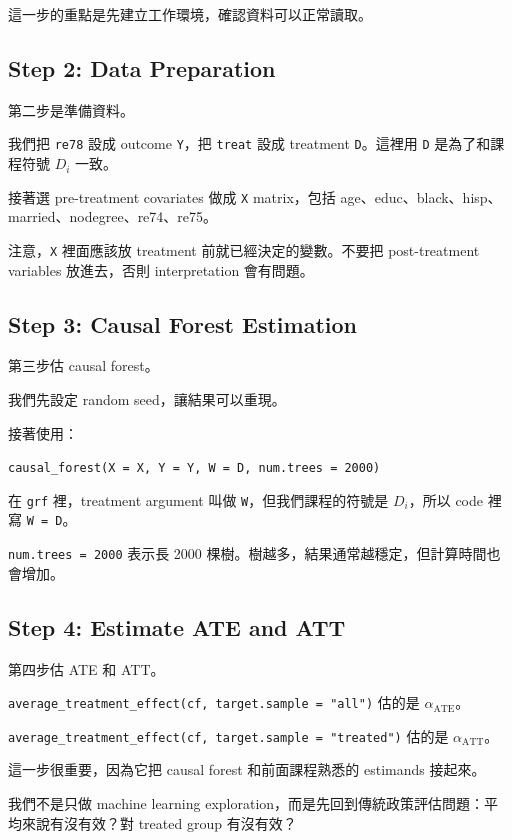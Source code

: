 \documentclass[
  chinese,
  11pt,
]{article}
\begin{document}
這一步的重點是先建立工作環境，確認資料可以正常讀取。

\subsection{Step 2: Data Preparation}\label{step-2-data-preparation}

第二步是準備資料。

我們把 \texttt{re78} 設成 outcome \texttt{Y}，把 \texttt{treat} 設成
treatment \texttt{D}。這裡用 \texttt{D} 是為了和課程符號 \(D_i\) 一致。

接著選 pre-treatment covariates 做成 \texttt{X} matrix，包括
age、educ、black、hisp、married、nodegree、re74、re75。

注意，\texttt{X} 裡面應該放 treatment 前就已經決定的變數。不要把
post-treatment variables 放進去，否則 interpretation 會有問題。

\subsection{Step 3: Causal Forest
Estimation}\label{step-3-causal-forest-estimation}

第三步估 causal forest。

我們先設定 random seed，讓結果可以重現。

接著使用：

\texttt{causal\_forest(X\ =\ X,\ Y\ =\ Y,\ W\ =\ D,\ num.trees\ =\ 2000)}

在 \texttt{grf} 裡，treatment argument 叫做
\texttt{W}，但我們課程的符號是 \(D_i\)，所以 code 裡寫
\texttt{W\ =\ D}。

\texttt{num.trees\ =\ 2000} 表示長 2000
棵樹。樹越多，結果通常越穩定，但計算時間也會增加。

\subsection{Step 4: Estimate ATE and
ATT}\label{step-4-estimate-ate-and-att}

第四步估 ATE 和 ATT。

\texttt{average\_treatment\_effect(cf,\ target.sample\ =\ "all")} 估的是
\(\alpha_{\text{ATE}}\)。

\texttt{average\_treatment\_effect(cf,\ target.sample\ =\ "treated")}
估的是 \(\alpha_{\text{ATT}}\)。

這一步很重要，因為它把 causal forest 和前面課程熟悉的 estimands 接起來。

我們不是只做 machine learning
exploration，而是先回到傳統政策評估問題：平均來說有沒有效？對 treated
group 有沒有效？
\end{document}
